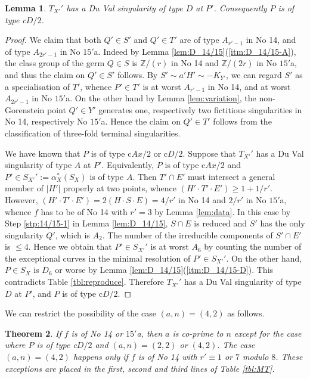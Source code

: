 \documentclass[a4paper,11pt]{amsart}
\newtheorem{theorem}{Theorem}[section]
\newtheorem{lemma}[theorem]{Lemma}
\theoremstyle{definition}
\theoremstyle{remark}
\numberwithin{equation}{section}
\newcommand{\bZ}{{\mathbb Z}}
\newcommand{\system}[1]{\left|{#1}\right|}
\begin{document}
\begin{lemma}\label{lem:cD/2_14/15}
$T_{X'}'$ has a Du Val singularity of type $D$ at $P'$.
Consequently $P$ is of type c$D/2$.
\end{lemma}

\begin{proof}
We claim that both $Q' \in S'$ and $Q' \in T'$ are
of type $A_{r'-1}$ in No 14,
and of type $A_{2r'-1}$ in No $\textrm{15}'$a.
Indeed by Lemma \ref{lem:D_14/15}(\ref{itm:D_14/15-A}),
the class group of the germ $Q \in S$ is
$\bZ/(r)$ in No 14 and $\bZ/(2r)$ in No $\textrm{15}'$a,
and thus the claim on $Q' \in S'$ follows.
By $S'\sim a'H'\sim -K_{Y'}$,
we can regard $S'$ as a specialisation of $T'$,
whence $P' \in T'$ is at worst $A_{r'-1}$ in No 14,
and at worst $A_{2r'-1}$ in No $\textrm{15}'$a.
On the other hand by Lemma \ref{lem:variation},
the non-Gorenstein point $Q' \in Y'$ generates
one, respectively two fictitious singularities
in No 14, respectively No $\textrm{15}'$a.
Hence the claim on $Q' \in T'$ follows from the classification
of three-fold terminal singularities.

We have known that $P$ is of type c$Ax/2$ or c$D/2$.
Suppose that $T_{X'}'$ has a Du Val singularity of type $A$ at $P'$.
Equivalently,
$P$ is of type c$Ax/2$ and $P' \in S_{X'}':=\alpha_X^*(S_X)$ is of type $A$.
Then $T' \cap E'$ must intersect a general member of $\system{H'}$
properly at two points,
whence $(H' \cdot T' \cdot E')\ge1+1/r'$.
However,
$(H' \cdot T' \cdot E')=2(H \cdot S \cdot E)=4/r'$ in No 14
and $2/r'$ in No $\textrm{15}'$a,
whence $f$ has to be of No 14 with $r'=3$ by Lemma \ref{lem:data}.
In this case by Step \ref{stp:14/15-1} in Lemma \ref{lem:D_14/15},
$S \cap E$ is reduced and $S'$ has the only singularity $Q'$,
which is $A_2$.
The number of the irreducible components of $S' \cap E'$ is $\le 4$.
Hence we obtain that $P' \in S_{X'}'$ is at worst $A_6$
by counting the number of the exceptional curves
in the minimal resolution of $P' \in S_{X'}'$.
On the other hand,
$P \in S_X$ is $D_6$ or worse by Lemma \ref{lem:D_14/15}(\ref{itm:D_14/15-D}).
This contradicts Table \ref{tbl:reproduce}.
Therefore $T_{X'}'$ has a Du Val singularity of type $D$ at $P'$,
and $P$ is of type c$D/2$.
\end{proof}

We can restrict the possibility of the case $(a,n)=(4,2)$ as follows.

\begin{theorem}\label{thm:14/15}
If $f$ is of No 14 or $\textrm{15}'$a,
then $a$ is co-prime to $n$ except for the case
where $P$ is of type c$D/2$ and $(a,n)=(2,2)$ or $(4,2)$.
The case $(a,n)=(4,2)$ happens
only if $f$ is of No 14 with $r'\equiv 1$ or $7$ modulo $8$.
These exceptions are placed in
the first, second and third lines of Table \textup{\ref{tbl:MT}}.
\end{theorem}
\end{document}
